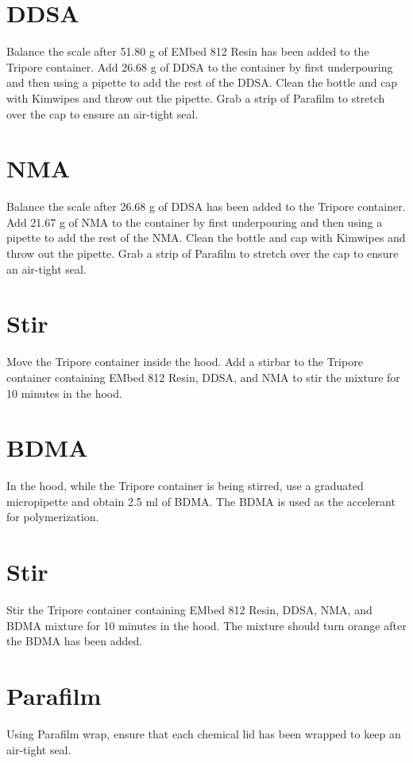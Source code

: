 \section{DDSA}\label{DDSA}
Balance the scale after 51.80 g of EMbed 812 Resin has been added to the
Tripore container.  Add 26.68 g of DDSA to the container by first underpouring
and then using a pipette to add the rest of the DDSA.  Clean the bottle and cap
with Kimwipes and throw out the pipette.  Grab a strip of Parafilm to stretch
over the cap to ensure an air-tight seal. 

\section{NMA}\label{NMA}
Balance the scale after 26.68 g of DDSA has been added to the Tripore
container.  Add 21.67 g of NMA to the container by first underpouring and then
using a pipette to add the rest of the NMA.  Clean the bottle and cap with
Kimwipes and throw out the pipette.  Grab a strip of Parafilm to stretch over
the cap to ensure an air-tight seal. 

\section{Stir}
Move the Tripore container inside the hood.  Add a stirbar to the Tripore
container containing EMbed 812 Resin, DDSA, and NMA to stir the mixture for 10
minutes in the hood.

\section{BDMA}
In the hood, while the Tripore container is being stirred, use a graduated
micropipette and obtain 2.5 ml of BDMA.  The BDMA is used as the accelerant for
polymerization.  

\section{Stir}
Stir the Tripore container containing EMbed 812 Resin, DDSA, NMA, and BDMA
mixture for 10 minutes in the hood.  The mixture should turn orange after the
BDMA has been added.

\section{Parafilm}
Using Parafilm wrap, ensure that each chemical lid has been wrapped to keep an
air-tight seal.


